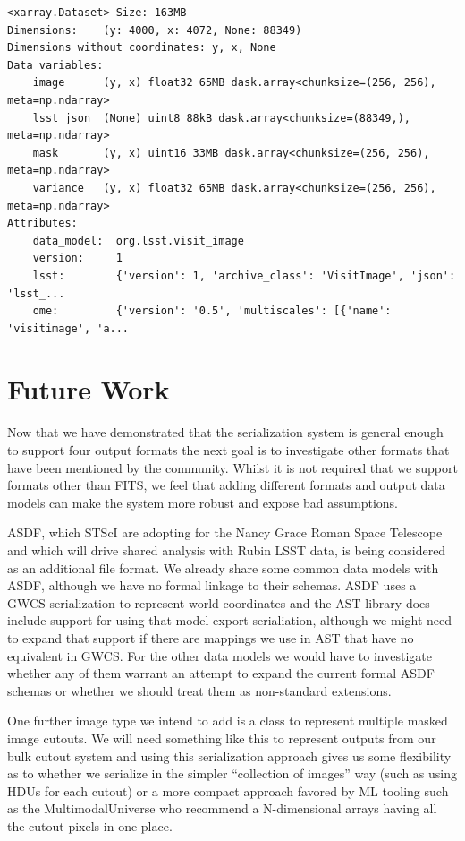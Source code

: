 \begin{lstlisting}[caption=Xarray interpretation of the same DP1 example Zarr file, label={lst:xarray}]
<xarray.Dataset> Size: 163MB
Dimensions:    (y: 4000, x: 4072, None: 88349)
Dimensions without coordinates: y, x, None
Data variables:
    image      (y, x) float32 65MB dask.array<chunksize=(256, 256), meta=np.ndarray>
    lsst_json  (None) uint8 88kB dask.array<chunksize=(88349,), meta=np.ndarray>
    mask       (y, x) uint16 33MB dask.array<chunksize=(256, 256), meta=np.ndarray>
    variance   (y, x) float32 65MB dask.array<chunksize=(256, 256), meta=np.ndarray>
Attributes:
    data_model:  org.lsst.visit_image
    version:     1
    lsst:        {'version': 1, 'archive_class': 'VisitImage', 'json': 'lsst_...
    ome:         {'version': '0.5', 'multiscales': [{'name': 'visitimage', 'a...
\end{lstlisting}

\section{Future Work}

Now that we have demonstrated that the serialization system is general enough to support four output formats the next goal is to investigate other formats that have been mentioned by the community.
Whilst it is not required that we support formats other than FITS, we feel that adding different formats and output data models can make the system more robust and expose bad assumptions.

ASDF\cite{2015A&C....12..240G}, which STScI are adopting for the Nancy Grace Roman Space Telescope\cite{10.25080/majora-212e5952-000} and which will drive shared analysis with Rubin LSST data, is being considered as an additional file format.
We already share some common data models with ASDF, although we have no formal linkage to their schemas.
ASDF uses a GWCS serialization\cite{2017ASPC..512..609D} to represent world coordinates and the AST library does include support for using that model export serialiation, although we might need to expand that support if there are mappings we use in AST that have no equivalent in GWCS.
For the other data models we would have to investigate whether any of them warrant an attempt to expand the current formal ASDF schemas or whether we should treat them as non-standard extensions.

One further image type we intend to add is a class to represent multiple masked image cutouts.
We will need something like this to represent outputs from our bulk cutout system\cite{DMTN-326} and using this serialization approach gives us some flexibility as to whether we serialize in the simpler ``collection of images'' way (such as using HDUs for each cutout) or a more compact approach favored by ML tooling such as the MultimodalUniverse\cite{2024RNAAS...8..301A} who recommend a N-dimensional arrays having all the cutout pixels in one place.

